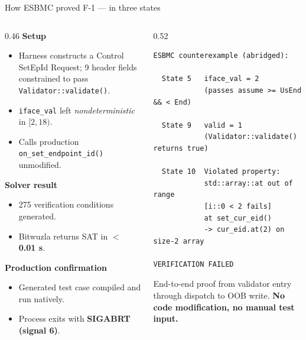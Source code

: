 \documentclass[aspectratio=169,11pt]{beamer}
\newcommand{\hil}[1]{\textbf{\textcolor{nvgreendark}{#1}}}
\begin{document}
\begin{frame}[fragile]{How ESBMC proved F-1 — in three states}
  \begin{columns}[T,onlytextwidth]
    \begin{column}{0.46\textwidth}
      \footnotesize
      \textbf{Setup}
      \begin{itemize}\setlength\itemsep{0.1em}
        \scriptsize
        \item Harness constructs a Control SetEpId Request; 9 header
              fields constrained to pass \texttt{Validator::validate()}.
        \item \texttt{iface\_val} left \emph{nondeterministic} in $[2, 18)$.
        \item Calls production \texttt{on\_set\_endpoint\_id()} unmodified.
      \end{itemize}

      \vspace{0.3em}
      \textbf{Solver result}
      \begin{itemize}\setlength\itemsep{0.1em}
        \scriptsize
        \item 275 verification conditions generated.
        \item Bitwuzla returns SAT in \hil{$<$ 0.01 s}.
      \end{itemize}

      \vspace{0.3em}
      \textbf{Production confirmation}
      \begin{itemize}\setlength\itemsep{0.1em}
        \scriptsize
        \item Generated test case compiled and run natively.
        \item Process exits with \hil{SIGABRT (signal 6)}.
      \end{itemize}
    \end{column}

    \begin{column}{0.52\textwidth}
\begin{lstlisting}[basicstyle=\ttfamily\tiny,language={}]
ESBMC counterexample (abridged):

  State 5   iface_val = 2
            (passes assume >= UsEnd && < End)

  State 9   valid = 1
            (Validator::validate() returns true)

  State 10  Violated property:
            std::array::at out of range
            [i::0 < 2 fails]
            at set_cur_eid()
            -> cur_eid.at(2) on size-2 array

VERIFICATION FAILED
\end{lstlisting}

      \vspace{0.2em}
      {\scriptsize End-to-end proof from validator entry through dispatch
      to OOB write. \hil{No code modification, no manual test input.}}
    \end{column}
  \end{columns}
\end{frame}
\end{document}

